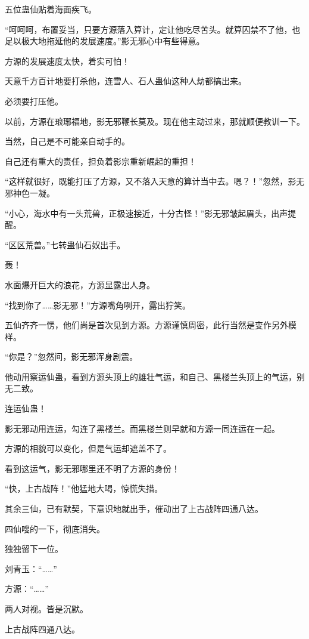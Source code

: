 
\begin{this_body}

五位蛊仙贴着海面疾飞。

“呵呵呵，布置妥当，只要方源落入算计，定让他吃尽苦头。就算囚禁不了他，也足以极大地拖延他的发展速度。”影无邪心中有些得意。

方源的发展速度太快，着实可怕！

天意千方百计地要打杀他，连雪人、石人蛊仙这种人劫都搞出来。

必须要打压他。

以前，方源在琅琊福地，影无邪鞭长莫及。现在他主动过来，那就顺便教训一下。

当然，自己是不可能亲自动手的。

自己还有重大的责任，担负着影宗重新崛起的重担！

“这样就很好，既能打压了方源，又不落入天意的算计当中去。嗯？！”忽然，影无邪神色一凝。

“小心，海水中有一头荒兽，正极速接近，十分古怪！”影无邪皱起眉头，出声提醒。

“区区荒兽。”七转蛊仙石奴出手。

轰！

水面爆开巨大的浪花，方源显露出人身。

“找到你了……影无邪！”方源嘴角咧开，露出狞笑。

五仙齐齐一愣，他们尚是首次见到方源。方源谨慎周密，此行当然是变作另外模样。

“你是？”忽然间，影无邪浑身剧震。

他动用察运仙蛊，看到方源头顶上的雄壮气运，和自己、黑楼兰头顶上的气运，别无二致。

连运仙蛊！

影无邪动用连运，勾连了黑楼兰。而黑楼兰则早就和方源一同连运在一起。

方源的相貌可以变化，但是气运却遮盖不了。

看到这运气，影无邪哪里还不明了方源的身份！

“快，上古战阵！”他猛地大喝，惊慌失措。

其余三仙，已有默契，下意识地就出手，催动出了上古战阵四通八达。

四仙嗖的一下，彻底消失。

独独留下一位。

刘青玉：“……”

方源：“……”

两人对视。皆是沉默。

上古战阵四通八达。


\end{this_body}
